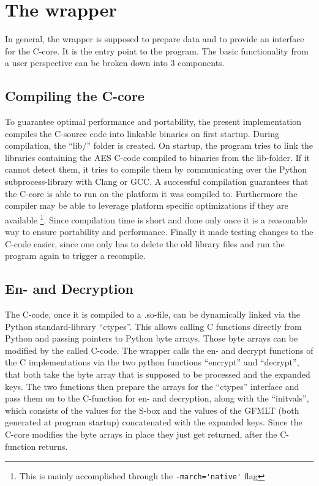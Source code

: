 \hypertarget{the-wrapper}{%
\section{The wrapper}\label{the-wrapper}}

In general, the wrapper is supposed to prepare data and to provide an
interface for the C-core. It is the entry point to the program. The
basic functionality from a user perspective can be broken down into 3
components.

\hypertarget{compiling-the-c-core}{%
\subsection{Compiling the C-core}\label{compiling-the-c-core}}

To guarantee optimal performance and portability, the present
implementation compiles the C-source code into linkable binaries on
first startup. During compilation, the \enquote{lib/} folder is created.
On startup, the program tries to link the libraries containing the AES
C-code compiled to binaries from the lib-folder. If it cannot detect
them, it tries to compile them by communicating over the Python
subprocess-library with Clang or GCC. A successful compilation
guarantees that the C-core is able to run on the platform it was
compiled to. Furthermore the compiler may be able to leverage platform
specific optimizations if they are available \footnote{This is mainly accomplished through the \lstinline{-march='native'} flag}. Since compilation time is
short and done only once it is a reasonable way to ensure portability
and performance. Finally it made testing changes to the C-code easier,
since one only has to delete the old library files and run the program
again to trigger a recompile.

\hypertarget{En--and-Decryption}{%
\subsection{En- and Decryption}\label{en--and-decryption}}

The C-code, once it is compiled to a .so-file, can be dynamically linked
via the Python standard-library \enquote{ctypes}. This allows calling C functions
directly from Python and passing pointers to Python byte arrays. Those
byte arrays can be modified by the called C-code. The wrapper
calls the en- and decrypt functions of the C implementations via the two
python functions ``encrypt'' and ``decrypt'', that both take the byte
array that is supposed to be processed and the expanded keys. The two
functions then prepare the arrays for the \enquote{ctypes} interface and pass them
on to the C-function for en- and decryption, along with the \enquote{initvals},
which consists of the values for the S-box and the values of the \ac{GFMLT}
(both generated at program startup) concatenated with the expanded keys.
Since the C-core modifies the byte arrays in place they just get
returned, after the C-function returns.

